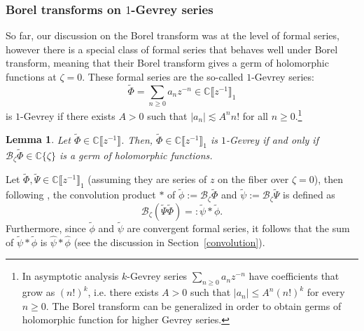 \documentclass{article}
\newcommand{\C}{\mathbb{C}}
\newcommand{\series}[1]{\tilde{#1}}
\newcommand{\borel}{\mathcal{B}}
\theoremstyle{definition}
\theoremstyle{plain}
\newtheorem{lemma}[definition]{Lemma}
\begin{document}
\subsubsection{Borel transforms on $1$-Gevrey series}\label{sec:Borel-gevrey}
So far, our discussion on the Borel transform was at the level of formal series, however there is a special class of formal series that behaves well under Borel transform, meaning that their Borel transform gives a germ of holomorphic functions at $\zeta=0$. These formal series are the so-called $1$-Gevrey series:
\[\tilde{\Phi}=\sum_{n\geq 0}a_nz^{-n}\in\C \llbracket z^{-1} \rrbracket_1\]
is $1$-Gevrey if there exists $A>0$ such that $|a_n|\lesssim A^n n!$ for all $n\geq 0$.\footnote{In asymptotic analysis $k$-Gevrey series $\sum_{n\geq 0}a_nz^{-n}$ have coefficients that grow as $(n!)^{k}$, i.e. there exists $A>0$ such that $|a_n|\leq A^n (n!)^k$ for every $n\geq 0$. The Borel transform can be generalized in order to obtain germs of holomorphic function for higher Gevrey series. }  
\begin{lemma}
Let $\tilde{\Phi}\in\C \llbracket z^{-1} \rrbracket$. Then, $\tilde{\Phi}\in\C \llbracket z^{-1} \rrbracket_1$ is $1$-Gevrey if and only if $\borel_\zeta\tilde{\Phi}\in\C\lbrace\zeta\rbrace$ is a germ of holomorphic functions. 
\end{lemma}
Let $\tilde{\Phi}, \tilde{\Psi}\in \C \llbracket z^{-1} \rrbracket_1$ (assuming they are series of $z$ on the fiber over $\zeta=0$), then following \cite[Definition 5.12]{diverg-resurg-i}, the convolution product $*$ of $\tilde{\phi}:=\borel_\zeta\tilde{\Phi}$ and $\tilde{\psi}:=\borel_\zeta\tilde{\Psi}$ is defined as
\[\borel_\zeta(\tilde{\Psi}\tilde{\Phi})=:\tilde{\psi}\ast\tilde{\phi}.\]
Furthermore, since $\tilde{\phi}$ and $\tilde{\psi}$ are convergent formal series, it follows that the sum of $\tilde{\psi}\ast\tilde{\phi}$ is $\hat{\psi}\ast\hat{\phi}$ (see the discussion in Section~\ref{convolution}).   %
\end{document}
